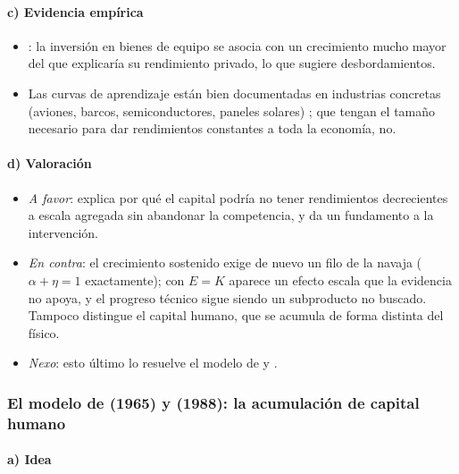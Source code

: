 \documentclass[11pt]{article}
\begin{document}
\paragraph{c) Evidencia empírica}

\begin{itemize}
\item \textcite{DeLongSummers1991Equipment}: la inversión en bienes de equipo se asocia con un crecimiento mucho mayor del que explicaría su rendimiento privado, lo que sugiere desbordamientos.
\item Las curvas de aprendizaje están bien documentadas en industrias concretas (aviones, barcos, semiconductores, paneles solares) ; que tengan el tamaño necesario para dar rendimientos constantes a toda la economía, no.
\end{itemize}

\paragraph{d) Valoración}

\begin{itemize}
\item \emph{A favor}: explica por qué el capital podría no tener rendimientos decrecientes a escala agregada sin abandonar la competencia, y da un fundamento a la intervención.
\item \emph{En contra}: el crecimiento sostenido exige de nuevo un filo de la navaja ($\alpha+\eta=1$ exactamente); con $E=K$ aparece un efecto escala que la evidencia no apoya, y el progreso técnico sigue siendo un subproducto no buscado. Tampoco distingue el capital humano, que se acumula de forma distinta del físico.
\item \emph{Nexo}: esto último lo resuelve el modelo de  y .
\end{itemize}

\subsubsection{El modelo de  (1965) y  (1988): la acumulación de capital humano}\label{sec:uzawa-lucas}

\paragraph{a) Idea}
\end{document}
